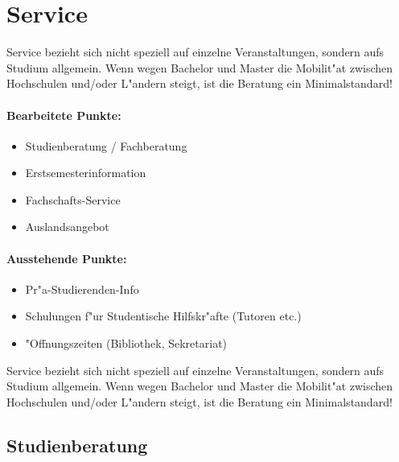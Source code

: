 \section{Service}
\label{l.service}

\begin{kcmt62}
\begin{komacmt62}
	Service bezieht sich nicht speziell auf einzelne Veranstaltungen, sondern
	aufs Studium allgemein. Wenn wegen Bachelor und Master die Mobilit"at
	zwischen Hochschulen und/oder L"andern steigt, ist die Beratung ein
	Minimalstandard!

\end{komacmt62}
\end{kcmt62}
\begin{kcmt}\begin{komacmt}
	\paragraph{Bearbeitete Punkte:}
	\begin{itemize}
		\item Studienberatung / Fachberatung
		\item Erstsemesterinformation
		\item Fachschafts-Service
		\item Auslandsangebot
	\end{itemize}

	\paragraph{Ausstehende Punkte:}
	\begin{itemize}
		\item Pr"a-Studierenden-Info
		\item Schulungen f"ur Studentische Hilfskr"afte (Tutoren etc.)
		\item "Offnungszeiten (Bibliothek, Sekretariat)
	\end{itemize}

	Service bezieht sich nicht speziell auf einzelne Veranstaltungen, sondern
	aufs Studium allgemein. Wenn wegen Bachelor und Master die Mobilit"at
	zwischen Hochschulen und/oder L"andern steigt, ist die Beratung ein
	Minimalstandard!
\end{komacmt}\end{kcmt}

\subsection{Studienberatung}

